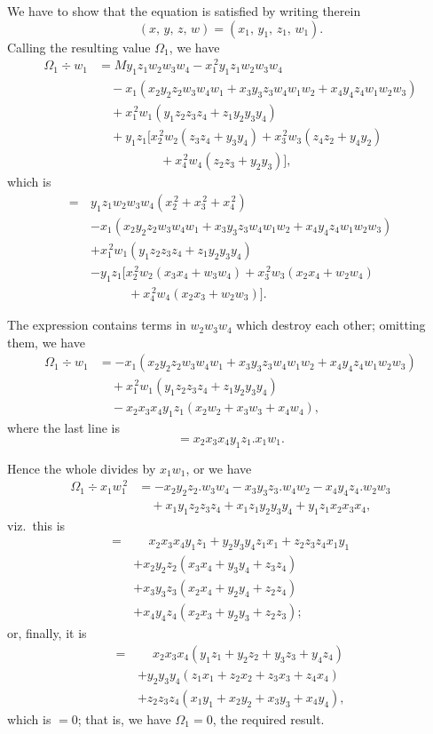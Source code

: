 \documentclass[11pt,a4paper]{book}
\begin{document}
We have to show that the equation is satisfied by writing therein
\[ (x,\, y,\, z,\, w) = (x_1,\, y_1,\, z_1,\, w_1). \]
Calling the resulting value $\Omega_1$, we have
\begin{align*}
\Omega_1 \div w_1 &= My_1z_1w_2w_3w_4 - x_1^{\,2}y_1z_1w_2w_3w_4 \\
&\quad - x_1(x_2y_2z_2w_3w_4w_1 + x_3y_3z_3w_4w_1w_2 + x_4y_4z_4w_1w_2w_3) \\
&\quad + x_1^{\,2}w_1(y_1z_2z_3z_4 + z_1y_2y_3y_4) \\
&\quad + y_1z_1[x_2^{\,2}w_2(z_3z_4 + y_3y_4) + x_3^{\,2}w_3(z_4z_2 + y_4y_2) \\
&\qquad\qquad\quad + x_4^{\,2}w_4(z_2z_3 + y_2y_3)],
\end{align*}
which is
\begin{align*}
=\, &y_1z_1w_2w_3w_4(x_2^{\,2} + x_3^{\,2} + x_4^{\,2}) \\
&- x_1(x_2y_2z_2w_3w_4w_1 + x_3y_3z_3w_4w_1w_2 + x_4y_4z_4w_1w_2w_3) \\
&+ x_1^{\,2}w_1(y_1z_2z_3z_4 + z_1y_2y_3y_4) \\
&- y_1z_1[x_2^{\,2}w_2(x_3x_4 + w_3w_4) + x_3^{\,2}w_3(x_2x_4 + w_2w_4) \\
&\qquad\quad + x_4^{\,2}w_4(x_2x_3 + w_2w_3)].
\end{align*}

The expression contains terms in $w_2w_3w_4$ which destroy each other; omitting them, we have
\begin{align*}
\Omega_1 \div w_1 &= -x_1(x_2y_2z_2w_3w_4w_1 + x_3y_3z_3w_4w_1w_2 + x_4y_4z_4w_1w_2w_3) \\
&\quad + x_1^{\,2}w_1(y_1z_2z_3z_4 + z_1y_2y_3y_4) \\
&\quad - x_2x_3x_4y_1z_1(x_2w_2 + x_3w_3 + x_4w_4),
\end{align*}
where the last line is
\[ = x_2x_3x_4y_1z_1 . x_1w_1. \]

Hence the whole divides by $x_1w_1$, or we have
\begin{align*}
\Omega_1 \div x_1w_1^{\,2} &= -x_2y_2z_2 . w_3w_4 - x_3y_3z_3 . w_4w_2 - x_4y_4z_4 . w_2w_3 \\
&\quad + x_1y_1z_2z_3z_4 + x_1z_1y_2y_3y_4 + y_1z_1x_2x_3x_4,
\end{align*}
viz.\ this is
\begin{align*}
=\, &\phantom{+} x_2x_3x_4y_1z_1 + y_2y_3y_4z_1x_1 + z_2z_3z_4x_1y_1 \\
&+ x_2y_2z_2(x_3x_4 + y_3y_4 + z_3z_4) \\
&+ x_3y_3z_3(x_2x_4 + y_2y_4 + z_2z_4) \\
&+ x_4y_4z_4(x_2x_3 + y_2y_3 + z_2z_3);
\end{align*}
or, finally, it is
\begin{align*}
=\, &\phantom{+} x_2x_3x_4(y_1z_1 + y_2z_2 + y_3z_3 + y_4z_4) \\
&+ y_2y_3y_4(z_1x_1 + z_2x_2 + z_3x_3 + z_4x_4) \\
&+ z_2z_3z_4(x_1y_1 + x_2y_2 + x_3y_3 + x_4y_4),
\end{align*}
which is $=0$; that is, we have $\Omega_1 = 0$, the required result.
\end{document}
